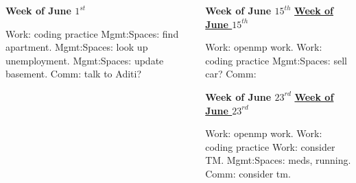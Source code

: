 \begin{columns}
\begin{column}{0.333\columnwidth}
\begin{columns}
\begin{column}{0.5\columnwidth}
\begin{block}{\small \bf Week of June $1^{st}$}
\begin{framed}
\begin{enumerate}
\mpitem Work: coding practice
\mpitem Mgmt:Spaces: find apartment. 
\mpitem Mgmt:Spaces: look up unemployment. 
\mpitem Mgmt:Spaces: update basement. 
\mpitem Comm: talk to Aditi? 
\end{enumerate}
\end{framed}
\ifdefined\POSTER
\end{block}
\fi


\end{column}


\begin{column}{0.5\columnwidth}

\ifdefined\POSTER
\begin{block}{\small \bf Week of June $15^{th}$}
\else
\underline{\bf Week of June $15^{th}$}\\
\fi
\begin{framed}
\begin{enumerate}
\mpitem Work: openmp work.
\mpitem Work: coding practice
\mpitem Mgmt:Spaces: sell car? 
\mpitem Comm: 
\end{enumerate}

\end{framed}
\ifdefined\POSTER 
\end{block}
\fi


\ifdefined\POSTER
\begin{block}{\small \bf Week of June $23^{rd}$}
\else
\underline{\bf Week of June $23^{rd}$}\\
\fi
\begin{framed}
\begin{enumerate}
\mpitem Work: openmp work.
\mpitem Work: coding practice
\mpitem Work: consider TM. 
\mpitem Mgmt:Spaces: meds, running. 
\mpitem Comm: consider tm.
\end{enumerate}
\end{framed}
\ifdefined\POSTER 
\end{block}
\fi



\end{column}

\end{columns}
\begin{columns}  %
\begin{column}{0.10\linewidth}


\end{column}
\end{columns}
\end{column}
\end{columns}
